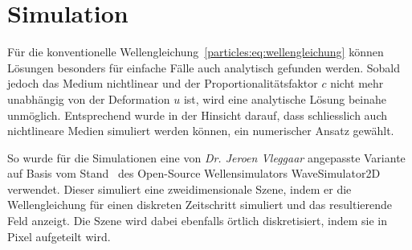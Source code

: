 %
%
%
%
\section{Simulation\label{particles:section:simulation}}

Für die konventionelle Wellengleichung~\eqref{particles:eq:wellengleichung} 
können Lösungen besonders für einfache Fälle auch analytisch gefunden werden.
Sobald jedoch das Medium nichtlinear und 
der Proportionalitätsfaktor $c$ nicht mehr unabhängig von der Deformation $u$ ist, 
wird eine analytische Lösung beinahe unmöglich.
Entsprechend wurde in der Hinsicht darauf, 
dass schliesslich auch nichtlineare Medien simuliert werden können, 
ein numerischer Ansatz gewählt.

So wurde für die Simulationen eine von \emph{Dr. Jeroen Vleggaar} angepasste Variante auf Basis vom Stand~\cite{particles:commit-wavesim2d} des Open-Source Wellensimulators WaveSimulator2D~\cite{particles:repo-wavesim2d} verwendet.
%
Dieser simuliert eine zweidimensionale Szene, indem er die Wellengleichung für einen diskreten Zeitschritt simuliert und das resultierende Feld anzeigt.
Die Szene wird dabei ebenfalls örtlich diskretisiert, indem sie in Pixel aufgeteilt wird.

